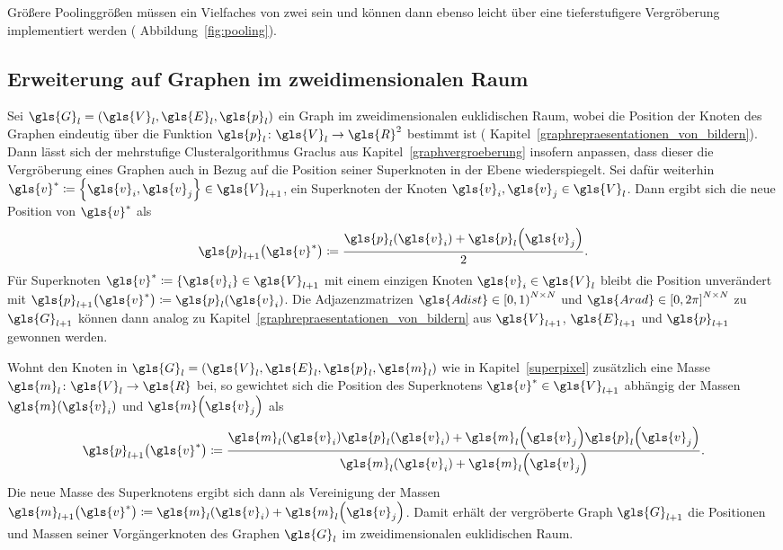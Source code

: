 Größere Poolinggrößen müssen ein Vielfaches von zwei sein und können dann ebenso leicht über eine tieferstufigere Vergröberung implementiert werden (\vgl{} Abbildung~\ref{fig:pooling}).

\subsection{Erweiterung auf Graphen im zweidimensionalen Raum}
\label{pooling_erweiterung}

Sei $\gls{G}_l = \left(\gls{V}_l, \gls{E}_l, \gls{p}_l\right)$ ein Graph im zweidimensionalen euklidischen Raum, wobei die Position der Knoten des Graphen eindeutig über die Funktion $\gls{p}_l \colon \gls{V}_l \to \gls{R}^2$ bestimmt ist (\vgl{} Kapitel~\ref{graphrepraesentationen_von_bildern}).
Dann lässt sich der mehrstufige Clusteralgorithmus Graclus aus Kapitel~\ref{graphvergroeberung} insofern anpassen, dass dieser die Vergröberung eines Graphen auch in Bezug auf die Position seiner Superknoten in der Ebene wiederspiegelt.
Sei dafür weiterhin $\gls{v}^* \coloneqq \left\{ \gls{v}_i, \gls{v}_j \right\} \in \gls{V}_{l+1}$, ein Superknoten der Knoten $\gls{v}_i, \gls{v}_j \in \gls{V}_l$.
Dann ergibt sich die neue Position von $\gls{v}^*$ als
\begin{equation*}
  \gls{p}_{l+1}\left(\gls{v}^*\right) \coloneqq \frac{\gls{p}_l\left(\gls{v}_i\right) + \gls{p}_l\left(\gls{v}_j\right)}{2}.
\end{equation*}
Für Superknoten $\gls{v}^* \coloneqq \left\{\gls{v}_i\right\} \in \gls{V}_{l+1}$ mit einem einzigen Knoten $\gls{v}_i \in \gls{V}_l$ bleibt die Position unverändert mit $\gls{p}_{l+1}\left(\gls{v}^*\right) \coloneqq \gls{p}_l\left(\gls{v}_i\right)$.
Die Adjazenzmatrizen $\gls{Adist} \in {\left[0, 1\right)}^{N \times N}$ und $\gls{Arad} \in {\left[0, 2\pi\right]}^{N \times N}$ zu $\gls{G}_{l+1}$ können dann analog zu Kapitel~\ref{graphrepraesentationen_von_bildern} aus $\gls{V}_{l+1}$, $\gls{E}_{l+1}$ und $\gls{p}_{l+1}$ gewonnen werden.

Wohnt den Knoten in $\gls{G}_l = \left(\gls{V}_l, \gls{E}_l, \gls{p}_l, \gls{m}_l\right)$ wie in Kapitel~\ref{superpixel} zusätzlich eine Masse $\gls{m}_l \colon \gls{V}_l \to \gls{R}$ bei, so gewichtet sich die Position des Superknotens $\gls{v}^* \in \gls{V}_{l+1}$ abhängig der Massen $\gls{m}\left(\gls{v}_i\right)$ und $\gls{m}\left(\gls{v}_j\right)$ als
\begin{equation*}
  \gls{p}_{l+1}\left(\gls{v}^*\right) \coloneqq \frac{\gls{m}_l\left(\gls{v}_i\right) \gls{p}_l\left(\gls{v}_i\right) + \gls{m}_l\left(\gls{v}_j\right) \gls{p}_l\left(\gls{v}_j\right)}{\gls{m}_l\left(\gls{v}_i\right) + \gls{m}_l\left(\gls{v}_j\right)}.
\end{equation*}
Die neue Masse des Superknotens ergibt sich dann als Vereinigung der Massen $\gls{m}_{l+1}\left(\gls{v}^*\right) \coloneqq \gls{m}_l\left(\gls{v}_i\right) + \gls{m}_l\left(\gls{v}_j\right)$.
Damit erhält der vergröberte Graph $\gls{G}_{l+1}$ die Positionen und Massen seiner Vorgängerknoten des Graphen $\gls{G}_l$ im zweidimensionalen euklidischen Raum.

